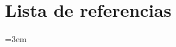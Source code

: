 \section{Lista de referencias}

\nocite{russellNorvig2020, kazil2020mesa, zilberstein2011metareasoning, kong2026open,
ma2018performance}

{\emergencystretch=3em
\printbibliography[heading=none]}
